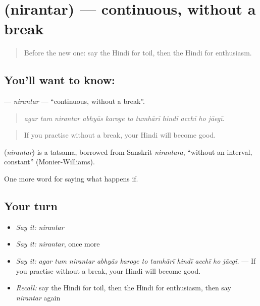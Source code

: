\section[\texorpdfstring{\hi{निरंतर} (nirantar)}{निरंतर (nirantar)}]{ (nirantar) — continuous, without a break}

\label{lesson:HI-C391-nirantar}



\begin{quote}
Before the new one: say the Hindi for toil, then the Hindi for enthusiasm.
\end{quote}

\subsection*{You'll want to know: }
\textbf{} — \emph{nirantar} — \textquotedblleft{}continuous, without a break\textquotedblright{}.

\begin{quote}
          
\end{quote}

\begin{quote}
\emph{agar tum nirantar abhyās karoge to tumhārī hindī acchī ho jāegī.}
\end{quote}

\begin{quote}
If you practise without a break, your Hindi will become good.
\end{quote}

\begin{cousinweb}
\textbf{} (\emph{nirantar}) is a tatsama, borrowed from Sanskrit \emph{nirantara}, \textquotedblleft{}without an interval, constant\textquotedblright{} (Monier-Williams).
\end{cousinweb}

\begin{grammarlens}[title={What you've built}]
One more word for saying what happens if.
\end{grammarlens}

\subsection*{Your turn}
\begin{itemize}
\raggedright
  \item \emph{Say it:} \emph{nirantar}
  \item \emph{Say it:} \emph{nirantar}, once more
  \item \emph{Say it:} \emph{agar tum nirantar abhyās karoge to tumhārī hindī acchī ho jāegī.} — If you practise without a break, your Hindi will become good.
  \item \emph{Recall:} say the Hindi for toil, then the Hindi for enthusiasm, then say \emph{nirantar} again
\end{itemize}

